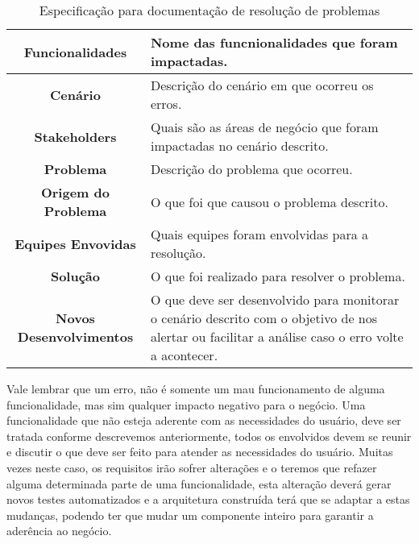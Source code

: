     \begin{table}[h!]
      \centering
      \begin{tabular}{|c|p{10cm}|}
        \hline
        \textbf{Funcionalidades} &
        Nome das funcnionalidades que foram impactadas. \\ \hline
        \textbf{Cenário} &
        Descrição do cenário em que ocorreu os erros. \\ \hline
        \textbf{Stakeholders} &
        Quais são as áreas de negócio que foram impactadas no cenário descrito. \\ \hline
        \textbf{Problema} &
        Descrição do problema que ocorreu. \\ \hline
        \textbf{Origem do Problema} &
        O que foi que causou o problema descrito. \\ \hline
        \textbf{Equipes Envovidas} &
        Quais equipes foram envolvidas para a resolução. \\ \hline
        \textbf{Solução} &
        O que foi realizado para resolver o problema. \\ \hline
        \textbf{Novos Desenvolvimentos} &
        O que deve ser desenvolvido para monitorar o cenário descrito com o
        objetivo de nos alertar ou facilitar a análise caso o erro volte a
        acontecer. \\ \hline
      \end{tabular}
      \caption{Especificação para documentação de resolução de problemas}
      \label{Tabela:12}
    \end{table}

    Vale lembrar que um erro, não é somente um mau funcionamento de alguma
    funcionalidade, mas sim qualquer impacto negativo para o negócio. Uma
    funcionalidade que não esteja aderente com as necessidades do usuário, deve
    ser tratada conforme descrevemos anteriormente, todos os envolvidos devem
    se reunir e discutir o que deve ser feito para atender as necessidades do
    usuário. Muitas vezes neste caso, os requisitos irão sofrer alterações e o
    teremos que refazer alguma determinada parte de uma funcionalidade, esta
    alteração deverá gerar novos testes automatizados e a arquitetura construída
    terá que se adaptar a estas mudanças, podendo ter que mudar um componente
    inteiro para garantir a aderência ao negócio.

